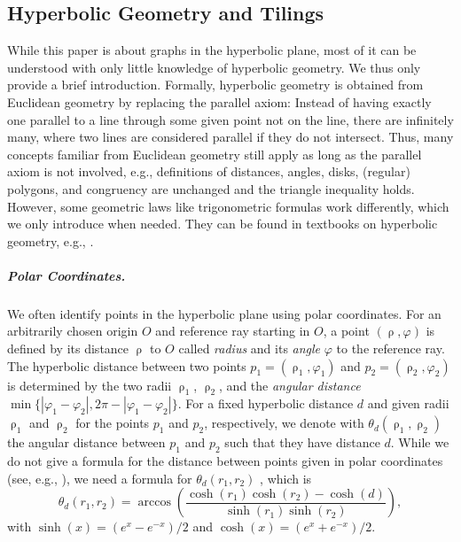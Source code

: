 \documentclass[a4paper,english,cleveref,thm-restate]{lipics-v2021}
\renewcommand{\phi}{\varphi}
\DeclareMathOperator{\rad}{\rho}
\begin{document}
\subsection{Hyperbolic Geometry and Tilings}

While this paper is about graphs in the hyperbolic plane, most of it can be understood with only little knowledge of hyperbolic geometry.
We thus only provide a brief introduction.
Formally, hyperbolic geometry is obtained from Euclidean geometry by replacing the parallel axiom: Instead of having exactly one parallel to a line through some given point not on the line, there are infinitely many, where two lines are considered parallel if they do not intersect.
Thus, many concepts familiar from Euclidean geometry still apply as long as the parallel axiom is not involved, e.g., definitions of distances, angles, disks, (regular) polygons, and congruency are unchanged and the triangle inequality holds.
However, some geometric laws like trigonometric formulas work differently,
which we only introduce when needed.
They can be found in textbooks on hyperbolic geometry, e.g., \cite{Euclid_Non_Euclid_Geomet-Green93}.

\subparagraph{Polar Coordinates.}

We often identify points in the hyperbolic plane using polar coordinates.
For an arbitrarily chosen origin $O$ and reference ray starting in $O$, a point $(\rad, \varphi)$ is defined by its distance $\rad$ to $O$ called \emph{radius} and its \emph{angle} $\varphi$ to the reference ray.
The hyperbolic distance between two points $p_1 = (\rad_1, \varphi_1)$ and $p_2 = (\rad_2, \varphi_2)$ is determined by the two radii $\rad_1$, $\rad_2$, and the \emph{angular distance} $\min\{|\phi_1 - \phi_2|, 2 \pi - |\phi_1 - \phi_2|\}$.
For a fixed hyperbolic distance $d$ and given radii $\rad_1$ and $\rad_2$ for the points $p_1$ and $p_2$, respectively, we denote with $\theta_d(\rad_1, \rad_2)$ the angular distance between $p_1$ and $p_2$ such that they have distance $d$.
While we do not give a formula for the distance between points given in polar coordinates (see, e.g., \cite{blasius_strongly_2023}), we need a formula for $\theta_d(r_1, r_2)$ , which is
%
\begin{equation}
    \label{eq:max_angular_distance}
    \theta_d(r_1,r_2) = \arccos\left(\frac{\cosh(r_1)\cosh(r_2)-\cosh(d)}{\sinh(r_1)\sinh(r_2)}\right),
\end{equation}
%
with $\sinh(x) = (e^x - e^{-x}) / 2$ and $\cosh(x) = (e^x + e^{-x}) / 2$.
\end{document}
